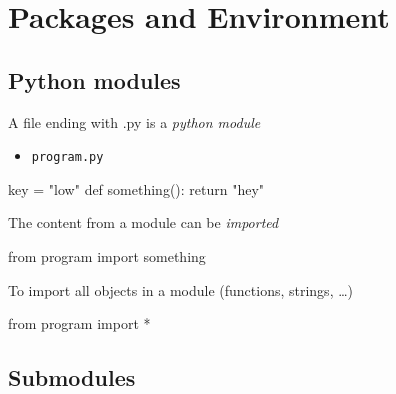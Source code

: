 \documentclass[
  letterpaper,
  DIV=11,
  numbers=noendperiod]{scrartcl}
\newenvironment{Shaded}{\begin{snugshade}}{\end{snugshade}}
\newcommand{\ControlFlowTok}[1]{\textcolor[rgb]{0.00,0.23,0.31}{#1}}
\newcommand{\ImportTok}[1]{\textcolor[rgb]{0.00,0.46,0.62}{#1}}
\newcommand{\KeywordTok}[1]{\textcolor[rgb]{0.00,0.23,0.31}{#1}}
\newcommand{\NormalTok}[1]{\textcolor[rgb]{0.00,0.23,0.31}{#1}}
\newcommand{\OperatorTok}[1]{\textcolor[rgb]{0.37,0.37,0.37}{#1}}
\newcommand{\StringTok}[1]{\textcolor[rgb]{0.13,0.47,0.30}{#1}}
\providecommand{\tightlist}{%
  \setlength{\itemsep}{0pt}\setlength{\parskip}{0pt}}\usepackage{longtable,booktabs,array}
\begin{document}
\section{Packages and Environment}\label{packages-and-environment}

\subsection{Python modules}\label{python-modules}

A file ending with .py is a \emph{python module}

\begin{itemize}
\tightlist
\item
  \texttt{program.py}
\end{itemize}

\begin{Shaded}
\begin{Highlighting}[]
\NormalTok{key }\OperatorTok{=} \StringTok{"low"}
\KeywordTok{def}\NormalTok{ something():}
    \ControlFlowTok{return} \StringTok{"hey"}
\end{Highlighting}
\end{Shaded}

The content from a module can be \emph{imported}

\begin{Shaded}
\begin{Highlighting}[]
\ImportTok{from}\NormalTok{ program }\ImportTok{import}\NormalTok{ something}
\end{Highlighting}
\end{Shaded}

To import all objects in a module (functions, strings, \ldots)

\begin{Shaded}
\begin{Highlighting}[]
\ImportTok{from}\NormalTok{ program }\ImportTok{import} \OperatorTok{*}
\end{Highlighting}
\end{Shaded}

\subsection{Submodules}\label{submodules}
\end{document}
